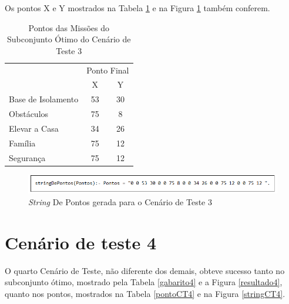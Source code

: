 	Os pontos X e Y mostrados na Tabela \ref{pontoCT3} e na Figura \ref{stringCT3} também conferem.
	
\begin{table}[!h]
\centering
\caption{Pontos das Missões do Subconjunto Ótimo do Cenário de Teste 3}
\label{pontoCT3}
\begin{tabular}{lcc}
\rowcolor[HTML]{00D2CB} 
\multicolumn{1}{c}{\cellcolor[HTML]{00D2CB}} & \multicolumn{2}{l}{\cellcolor[HTML]{00D2CB}Ponto Final} \\ 
\rowcolor[HTML]{C0F2F0} 
\multicolumn{1}{c}{\cellcolor[HTML]{00D2CB}Missão} & \multicolumn{1}{c}{\cellcolor[HTML]{C0F2F0}X} & \multicolumn{1}{c}{\cellcolor[HTML]{C0F2F0}Y} \\
 Base de Isolamento & 53 & 30 \\
 Obstáculos & 75 & 8 \\
 Elevar a Casa & 34 & 26 \\
 Família & 75 & 12 \\
 Segurança & 75 & 12    \\          
\end{tabular}
\end{table}


\FloatBarrier
\begin{figure}[!h]
\centering
\includegraphics[keepaspectratio=true,scale=0.7]{figuras/stringCT3.png}
\caption{\textit{String} De Pontos gerada para o Cenário de Teste 3}
\label{stringCT3}
\end{figure}



\section{Cenário de teste 4}

	O quarto Cenário de Teste, não diferente dos demais, obteve sucesso tanto no subconjunto ótimo, mostrado pela Tabela \ref{gabarito4} e a Figura \ref{resultado4}, quanto nos pontos, mostrados na Tabela \ref{pontoCT4} e na Figura \ref{stringCT4}.

